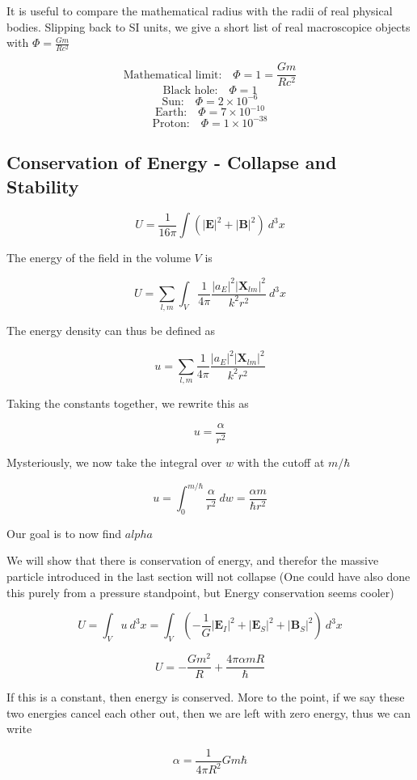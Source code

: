 \documentclass {article}
\renewcommand\vec{\mathbf}
\begin{document}
It is useful to compare the mathematical radius with the radii of real physical bodies. Slipping back to SI units, we give a short list of real macroscopice objects with $\Phi = \frac {Gm}{Rc^2}$

$$\text{Mathematical limit:  } ~~~ \Phi = 1 = \frac {Gm}{Rc^2}$$
$$\text{Black hole:  } ~~~ \Phi = 1$$
$$\text{Sun:  } ~~~ \Phi = 2 \times 10^{-6}$$
$$\text{Earth:  } ~~~ \Phi = 7 \times 10^{-10}$$
$$\text{Proton:  } ~~~ \Phi = 1\times 10^{-38}$$


\newpage
\subsection{Conservation of Energy - Collapse and Stability}

$$U = \frac 1 {16 \pi} \int \left( |\vec E  |^2 + |\vec B |^2 \right) ~ d^3x $$

The energy of the field in the volume $V$ is


$$U  =\sum_{l, m}   \int_V \frac 1 {4 \pi}  \frac {|a_E|^2 |\vec X_{lm} |^2}{k^2 r^2} ~ d^3x $$

The energy density can thus be defined as

$$u  = \sum_{l, m}   \frac 1 {4\pi}  \frac {|a_E|^2 |\vec X_{lm} |^2}{k^2 r^2} $$

Taking the constants together, we rewrite this as 

$$u  =  \frac {\alpha}{r^2} $$


Mysteriously, we now take the integral over $w$ with the cutoff at $m/ \hbar$

$$u = \int_0^{m/ \hbar}  \frac {\alpha}{r^2} ~dw = \frac {\alpha m}{\hbar r^2}$$

Our goal is to now find $alpha$


We will show that there is conservation of energy, and therefor the massive particle introduced in the last section will not collapse (One could have also done this purely from a pressure standpoint, but Energy conservation seems cooler)

$$U = \int_V u ~ d^3x = \int_V \left( - \frac 1 G |\vec E_I |^2  +  |\vec E_S |^2  +  |\vec B_S |^2 \right) ~ d^3x$$

$$U = - \frac {Gm^2} R + \frac {4 \pi \alpha m R} \hbar$$

If this is a constant, then energy is conserved. More to the point, if we say these two energies cancel each other out, then we are left with zero energy, thus we can write

$$\alpha = \frac 1 {4 \pi R^2} Gm \hbar$$
\end{document}
